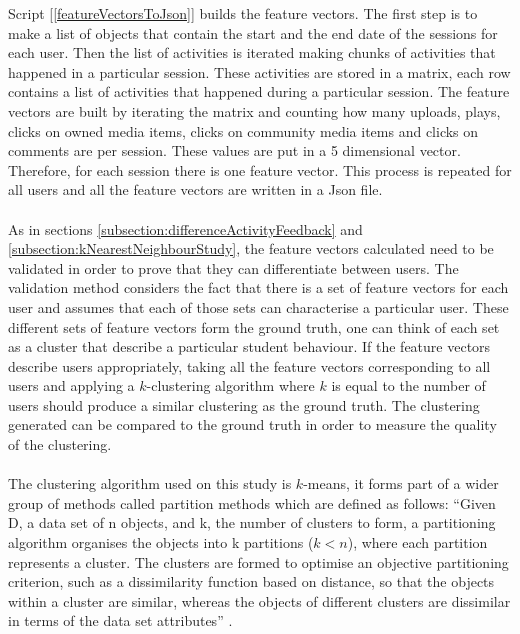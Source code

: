 \documentclass[11pt, oneside]{article}   	%
\begin{document}
\noindent Script [\ref{featureVectorsToJson}] builds the feature vectors. The first step is to make a list of objects that contain the start and the end date of the sessions for each user. Then the list of activities is iterated making chunks of activities that happened in a particular session. These activities are stored in a matrix, each row contains a list of activities that happened during a particular session. The feature vectors are built by iterating the matrix and counting how many uploads, plays, clicks on owned media items, clicks on community media items and clicks on comments are per session. These values are put in a 5 dimensional vector. Therefore, for each session there is one feature vector. This process is repeated for all users and all the feature vectors are written in a Json file.\\\\
As in sections \ref{subsection:differenceActivityFeedback} and \ref{subsection:kNearestNeighbourStudy}, the feature vectors calculated need to be validated in order to prove that they can differentiate between users. The validation method considers the fact that there is a set of feature vectors for each user and assumes that each of those sets can characterise a particular user. These different sets of feature vectors form the ground truth, one can think of each set as a cluster  that describe a particular student behaviour. If the feature vectors describe users appropriately, taking all the feature vectors corresponding to all users and applying a $k$-clustering algorithm where $k$ is equal to the number of users should produce a similar clustering as the ground truth. The clustering generated can be compared to the ground truth in order to measure the quality of the clustering.\\\\
The clustering algorithm used on this study is $k$-means, it forms part of a wider group of methods called partition methods which are defined as follows: ``Given D, a data set of n objects, and k, the number of clusters to form, a partitioning algorithm organises the objects into k partitions ($k < n$), where each partition represents a cluster. The clusters are formed to optimise an objective partitioning criterion, such as a dissimilarity function based on distance, so that the objects within a cluster are similar, whereas the objects of different clusters are dissimilar in terms of the data set attributes'' \cite{Han:2005:DMC:1076797}.\\\\
\end{document}
